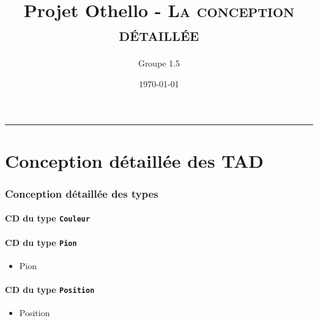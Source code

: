 \documentclass[11pt]{article}
\title{Projet Othello - \textsc{La conception détaillée}}
\author{Groupe 1.5}
\date{\today}
\begin{document}
\maketitle
\noindent\rule{\textwidth}{1.3pt}

\renewcommand{\tt}[1]{\og \texttt{#1} \fg}

\part{Conception détaillée des TAD}

\section{Conception détaillée des types}

\subsection{CD du type \tt{Couleur}}
\begin{itemize}
\end{itemize}

\subsection{CD du type \tt{Pion}}
\begin{itemize}\item
\begin{algorithme}
\begin{enregistrement}{Pion}
\end{enregistrement}
\end{algorithme} 
\end{itemize}

\subsection{CD du type \tt{Position}}
\begin{itemize}
\item
\begin{algorithme}
\begin{enregistrement}{Position}
\end{enregistrement}
\end{algorithme} 
\end{itemize}
\end{document}
